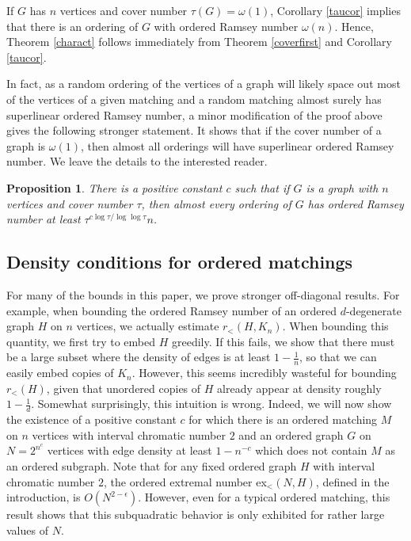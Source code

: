 \documentclass[11pt]{article}
\newtheorem{proposition}[theorem]{Proposition}
\begin{document}
If $G$ has $n$ vertices and cover number $\tau(G)=\omega(1)$, Corollary \ref{taucor} implies that there is an ordering of $G$ with ordered Ramsey number $\omega(n)$. Hence, Theorem \ref{charact} follows immediately from Theorem \ref{coverfirst} and Corollary \ref{taucor}. 

In fact, as a random ordering of the vertices of a graph will likely space out most of the vertices of a given matching and a random matching almost surely has superlinear ordered Ramsey number, a minor modification of the proof above gives the following stronger statement. It shows that if the cover number of a graph is $\omega(1)$, then almost all orderings will have superlinear ordered Ramsey number. We leave the details to the interested reader. 

\begin{proposition}\label{taucor2}
There is a positive constant $c$ such that if $G$ is a graph with $n$ vertices and cover number $\tau$,  then almost every ordering of $G$ has ordered Ramsey number at least $\tau^{c\log \tau / \log \log \tau}n$. 
\end{proposition}

\subsection{Density conditions for ordered matchings}

For many of the bounds in this paper, we prove stronger off-diagonal results. For example, when bounding the ordered Ramsey number of an ordered $d$-degenerate graph $H$ on $n$ vertices, we actually estimate $r_<(H, K_n)$. When bounding this quantity, we first try to embed $H$ greedily. If this fails, we show that there must be a large subset where the density of edges is at least $1 - \frac{1}{n}$, so that we can easily embed copies of $K_n$. However, this seems incredibly wasteful for bounding $r_<(H)$, given that unordered copies of $H$ already appear at density roughly $1 - \frac{1}{d}$. Somewhat surprisingly, this intuition is wrong. Indeed, we will now show the existence of a positive constant $c$ for which there is an ordered matching $M$ on $n$ vertices with interval chromatic number $2$ and an ordered graph $G$ on $N=2^{n^c}$ vertices with edge density at least $1-n^{-c}$ which does not contain $M$ as an ordered subgraph. Note that for any fixed ordered graph $H$ with interval chromatic number $2$, the ordered extremal number ex$_<(N, H)$, defined in the introduction, is $O(N^{2-\epsilon})$. However, even for a typical ordered matching, this result shows that this subquadratic behavior is only exhibited for rather large values of $N$. 
\end{document}
